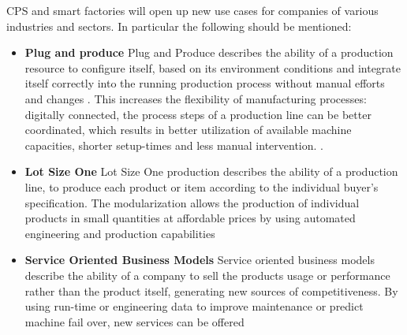 \ac{CPS} and smart factories will open up new use cases for companies of various industries and sectors. In particular the following should be mentioned:
\begin{itemize}
    \item[] \textbf{Plug and produce} Plug and Produce describes the ability of a production resource to configure itself, based on its environment conditions and integrate itself correctly into the running production process without manual efforts and changes \cite{Schleipen2015Requirements4.0} \cite[p.146]{Ye20204.0}. This increases the flexibility of manufacturing processes: digitally connected, the process steps of a production line can be better coordinated, which results in better utilization of available machine capacities, shorter setup-times and less manual intervention. \cite[p.16]{Acatech2013Recommendations4.0}. 
    \item[] \textbf{Lot Size One} Lot Size One production describes the ability of a production line, to produce each product or item according to the individual buyer's specification. The modularization allows the production of individual products in small quantities at affordable prices by using automated engineering and production capabilities \cite[p.15]{Acatech2013Recommendations4.0}
    \item[] \textbf{Service Oriented Business Models} Service oriented business models describe the ability of a company to sell the products usage or performance rather than the product itself, generating new sources of competitiveness. By using run-time or engineering data to improve maintenance or predict machine fail over, new services can be offered \cite{Bendig2021Equipment-as-a-ServiceIndustry} \cite[p.16]{Acatech2013Recommendations4.0}
\end{itemize}

